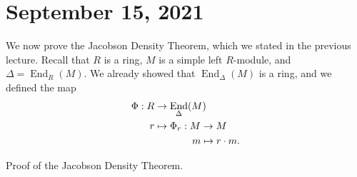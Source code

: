 \documentclass[10pt]{article}
\numberwithin{equation}{section}
\DeclareMathOperator{\End}{End}
\theoremstyle{newstyle}
\begin{document}
\section{September 15, 2021}

We now prove the Jacobson Density Theorem, which we stated in the previous lecture. Recall that 
$R$ is a ring, $M$ is a simple left $R$-module, and $\Delta = \End_R(M)$. We already showed that 
$\End_\Delta(M)$ is a ring, and we defined the map 
\begin{align*}
    \Phi : R &\to \End_\Delta(M) \\
    r &\mapsto \Phi_r : M \to M \\
    & \hspace{1.33cm} m \mapsto r \cdot m.
\end{align*}

{\sc Proof of the Jacobson Density Theorem.}
\end{document}

